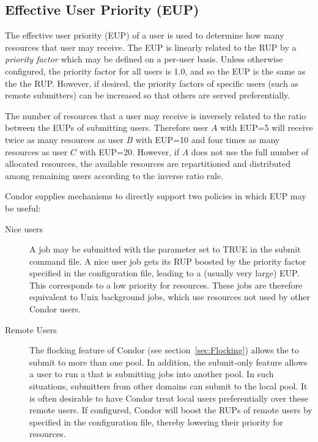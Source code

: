 \subsection{Effective User Priority (EUP)}
The effective user priority (EUP) of a user is used to determine
how many resources that user may receive.
The EUP is linearly related to the RUP
by a \emph{priority factor} which may be defined on a per-user basis.
Unless otherwise configured, the priority factor for all users is 1.0,
and so the EUP is the same as the the RUP.
However, if desired, the priority factors of
specific users (such as remote submitters) can be increased so that 
others are served preferentially.

The number of resources that a user may receive is inversely related
to the ratio between the EUPs of submitting users.
Therefore user $A$ with EUP=5 will receive
twice as many resources as user $B$ with EUP=10 and four times as many 
resources as user $C$ with EUP=20.
However, if $A$ does not use the full number
of allocated resources,
the available resources are repartitioned and distributed among
remaining users according to the inverse ratio rule.


Condor supplies mechanisms to directly support two policies in which EUP may
be useful:
\begin{description}
	\item[Nice users]  A job may be submitted with the parameter 
	 set to TRUE in the submit command file.
	A nice user job gets its RUP boosted by the 
	 priority factor specified in the 
	configuration file, leading to a (usually very large) EUP.
	This corresponds to a low priority for resources.
	These jobs are therefore equivalent to Unix background jobs,
	which use resources not used by other Condor users.

	\item[Remote Users] The flocking feature of Condor (see
	section~\ref{sec:Flocking}) allows the  to
	submit to more than one pool.
	In addition, the submit-only feature allows a user to run a
	 that is submitting jobs into another pool.
	In such situations, submitters from other domains
	can submit to the local pool.
	It is often desirable to have Condor treat local users
	preferentially over these remote users.
	If configured, Condor will boost the RUPs of remote users by
	specified in the configuration file,
	thereby lowering their priority for resources.
\end{description}

